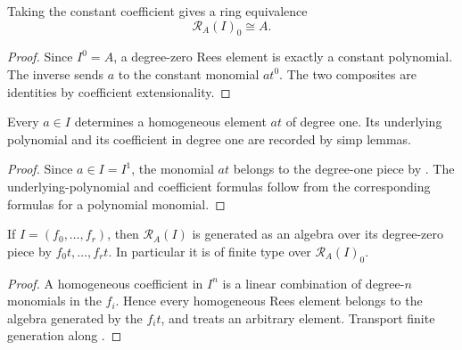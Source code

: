 \begin{lemma}
  \label{lemma:nagata-rees-degree-zero}
  \leanok

  Taking the constant coefficient gives a ring equivalence
  \[
    \mathcal R_A(I)_0\cong A.
  \]
\end{lemma}

\begin{proof}
  \leanok
  Since $I^0=A$, a degree-zero Rees element is exactly a constant polynomial.
  The inverse sends $a$ to the constant monomial $at^0$.  The two composites
  are identities by coefficient extensionality.
\end{proof}

\begin{lemma}
  \label{lemma:nagata-rees-degree-one-element}
  \leanok

  Every $a\in I$ determines a homogeneous element $at$ of degree one.  Its
  underlying polynomial and its coefficient in degree one are recorded by
  simp lemmas.
\end{lemma}

\begin{proof}
  \leanok
  Since $a\in I=I^1$, the monomial $at$ belongs to the degree-one piece by
  .  The underlying-polynomial and
  coefficient formulas follow from the corresponding formulas for a
  polynomial monomial.
\end{proof}

\begin{proposition}
  \label{prop:nagata-rees-finite-generation}
  \leanok

  If $I=(f_0,\ldots,f_r)$, then $\mathcal R_A(I)$ is generated as an algebra
  over its degree-zero piece by $f_0t,\ldots,f_rt$.  In particular it is of
  finite type over $\mathcal R_A(I)_0$.
\end{proposition}

\begin{proof}
  \leanok
  A homogeneous coefficient in $I^n$ is a linear combination of degree-$n$
  monomials in the $f_i$.  Hence every homogeneous Rees element belongs to the
  algebra generated by the $f_it$, and
   treats an arbitrary element.
  Transport finite generation along
  .
\end{proof}

